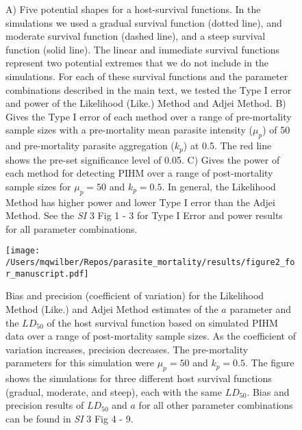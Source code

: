 \documentclass[12pt, a4paper]{article}
\begin{document}
\begin{figure}


\caption{A) Five potential shapes for a host-survival functions. In the simulations we used a gradual survival function (dotted line), and moderate survival function (dashed line), and a steep survival function (solid line). The linear and immediate survival functions represent two potential extremes that we do not include in the simulations. For each of these survival functions and the parameter combinations described in the main text, we tested the Type I error and power of the Likelihood (Like.) Method and Adjei Method. B) Gives the Type I error of each method over a range of pre-mortality sample sizes with a pre-mortality mean parasite intensity ($\mu_p$) of 50 and pre-mortality parasite aggregation ($k_p$) at 0.5. The red line shows the pre-set significance level of 0.05. C) Gives the power of each method for detecting PIHM over a range of post-mortality sample sizes for $\mu_p = 50$ and $k_p = 0.5$.  In general, the Likelihood Method has higher power and lower Type I error than the Adjei Method.  See the \emph{SI} 3 Fig 1 - 3 for Type I Error and power results for all parameter combinations.}

\label{fig:question1}

\end{figure}

\begin{figure}
    \texttt{[image: /Users/mqwilber/Repos/parasite\_mortality/results/figure2\_for\_manuscript.pdf]}

    \caption{Bias and precision (coefficient of variation) for the Likelihood Method (Like.) and Adjei Method estimates of the $a$ parameter and the $LD_{50}$ of the host survival function based on simulated PIHM data over a range of post-mortality sample sizes.  As the coefficient of variation increases, precision decreases. The pre-mortality parameters for this simulation were $\mu_p = 50$ and $k_p = 0.5$.  The figure shows the simulations for three different host survival functions (gradual, moderate, and steep), each with the same $LD_{50}$.  Bias and precision results of $LD_{50}$ and $a$ for all other parameter combinations can be found in \emph{SI} 3 Fig 4 - 9.}

    \label{fig:question2}

\end{figure}
\end{document}
